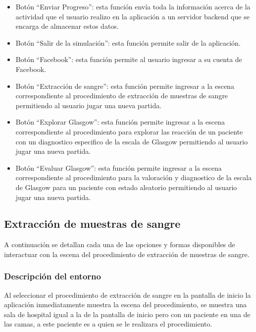 \begin{itemize}
\item Botón \enquote{Enviar Progreso}: esta función envía toda la información
    acerca de la actividad que el usuario realizo en la aplicación a un servidor
    backend que se encarga de almacenar estos datos.
\item Botón \enquote{Salir de la simulación}: esta función permite salir de la
    aplicación.
\item Botón \enquote{Facebook}: esta función permite al usuario ingresar a su
    cuenta de Facebook.
\item Botón \enquote{Extracción de sangre}: esta función permite ingresar a la
    escena correspondiente al procedimiento de extracción de muestras de sangre
    permitiendo al usuario jugar una nueva partida.
\item Botón \enquote{Explorar Glasgow}: esta función permite ingresar a la
    escena correspondiente al procedimiento para explorar las reacción de un
    paciente con un diagnostico especifico de la escala de Glasgow permitiendo
    al usuario jugar una nueva partida.
\item Botón \enquote{Evaluar Glasgow}: esta función permite ingresar a la escena
    correspondiente al procedimiento para la valoración y diagnostico de la
    escala de Glasgow para un paciente con estado aleatorio permitiendo al
    usuario jugar una nueva partida.
\end{itemize}


\subsection{Extracción de muestras de sangre}

A continuación se detallan cada una de las opciones y formas disponibles de
interactuar con la escena del procedimiento de extracción de muestras de sangre.

\subsubsection{Descripción del entorno}

Al seleccionar el procedimiento de extracción de sangre en la pantalla de inicio 
la aplicación inmediatamente muestra la escena del procedimiento, se muestra una 
sala de hospital igual a la de la pantalla de inicio pero con un paciente en una 
de las camas, a este paciente es a quien se le realizara el procedimiento.

